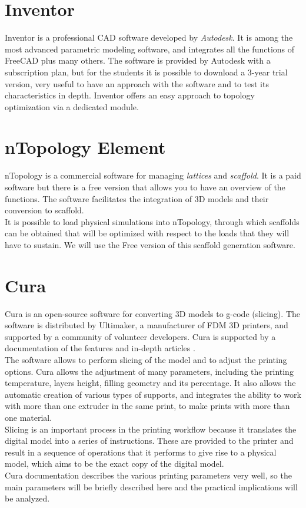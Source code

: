 \section{Inventor}
Inventor \parencite{Reference43} is a professional CAD software developed by \emph{Autodesk}. It is among the most advanced parametric modeling software, and integrates all the functions of FreeCAD plus many others. The software is provided by Autodesk with a subscription plan, but for the students it is possible to download a 3-year trial version, very useful to have an approach with the software and to test its characteristics in depth. Inventor offers an easy approach to topology optimization via a dedicated module.

\section{nTopology Element}
nTopology \parencite{Reference139} is a commercial software for managing \emph{lattices} and \emph{scaffold}. It is a paid software but there is a free version that allows you to have an overview of the functions. The software facilitates the integration of 3D models and their conversion to scaffold.\\ It is possible to load physical simulations into nTopology, through which scaffolds can be obtained that will be optimized with respect to the loads that they will have to sustain. We will use the Free version of this scaffold generation software.

\section{Cura}
Cura \parencite{Reference44} is an open-source software for converting 3D models to g-code (slicing). The software is distributed by Ultimaker, a manufacturer of FDM 3D printers, and supported by a community of volunteer developers. Cura is supported by a documentation of the features \parencite{Reference45} and in-depth articles \parencite{Reference52}. \\
The software allows to perform slicing of the model and to adjust the printing options. Cura allows the adjustment of many parameters, including the printing temperature, layers height, filling geometry and its percentage. It also allows the automatic creation of various types of supports, and integrates the ability to work with more than one extruder in the same print, to make prints with more than one material.\\
Slicing is an important process in the printing workflow because it translates the digital model into a series of instructions. These are provided to the printer and result in a sequence of operations that it performs to give rise to a physical model, which aims to be the exact copy of the digital model.\\
Cura documentation describes the various printing parameters very well, so the main parameters will be briefly described here and the practical implications will be analyzed.

